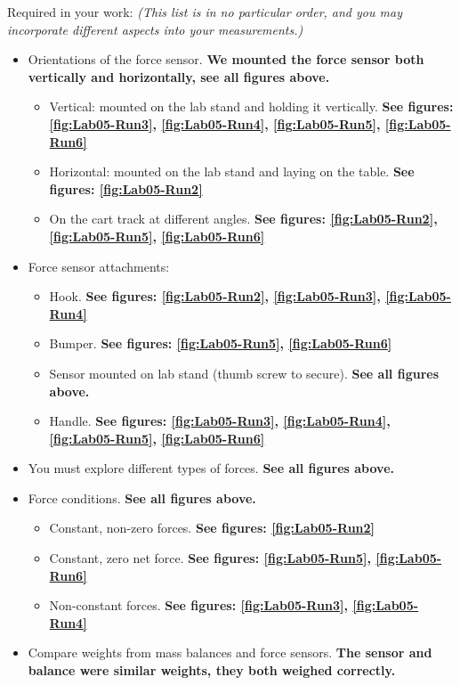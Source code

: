 \documentclass[idxtotoc,hyperref,openany]{labbook} %
\begin{document}

Required in your work: \textit{(This list is in no particular order, and you may incorporate different aspects into your measurements.)}
\begin{itemize}
    \item Orientations of the force sensor. \textbf{We mounted the force sensor both vertically and horizontally, see all figures above.}
    \begin{itemize}
        \item Vertical: mounted on the lab stand and holding it vertically. \textbf{See figures: \ref{fig:Lab05-Run3}, \ref{fig:Lab05-Run4}, \ref{fig:Lab05-Run5}, \ref{fig:Lab05-Run6}}
        \item Horizontal: mounted on the lab stand and laying on the table. \textbf{See figures: \ref{fig:Lab05-Run2}}
        \item On the cart track at different angles. \textbf{See figures: \ref{fig:Lab05-Run2}, \ref{fig:Lab05-Run5}, \ref{fig:Lab05-Run6}}
    \end{itemize}
    \item Force sensor attachments:
    \begin{itemize}
        \item Hook. \textbf{See figures: \ref{fig:Lab05-Run2}, \ref{fig:Lab05-Run3}, \ref{fig:Lab05-Run4}}
        \item Bumper. \textbf{See figures: \ref{fig:Lab05-Run5}, \ref{fig:Lab05-Run6}}
        \item Sensor mounted on lab stand (thumb screw to secure). \textbf{See all figures above.}
        \item Handle. \textbf{See figures: \ref{fig:Lab05-Run3}, \ref{fig:Lab05-Run4}, \ref{fig:Lab05-Run5}, \ref{fig:Lab05-Run6}}
    \end{itemize}
    \item You must explore different types of forces. \textbf{See all figures above.}
    \item Force conditions. \textbf{See all figures above.}
    \begin{itemize}
        \item Constant, non-zero forces. \textbf{See figures: \ref{fig:Lab05-Run2}}
        \item Constant, zero net force. \textbf{See figures: \ref{fig:Lab05-Run5}, \ref{fig:Lab05-Run6}}
        \item Non-constant forces. \textbf{See figures: \ref{fig:Lab05-Run3}, \ref{fig:Lab05-Run4}}
    \end{itemize}
    \item Compare weights from mass balances and force sensors. \textbf{The sensor and balance were similar weights, they both weighed correctly.}
\end{itemize}
\end{document}
